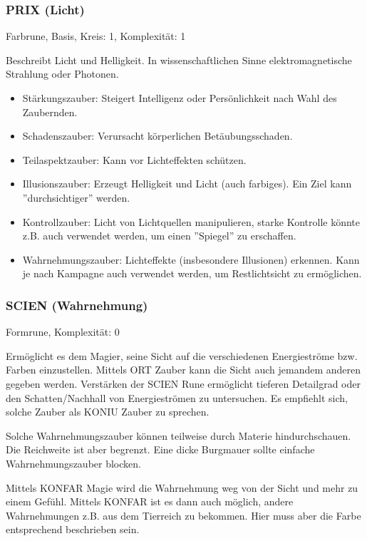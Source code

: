 \documentclass{article}
\begin{document}
\subsubsection{PRIX (Licht)}

Farbrune, Basis, Kreis: 1, Komplexität: 1

Beschreibt Licht und Helligkeit. In wissenschaftlichen Sinne elektromagnetische Strahlung oder Photonen.

\begin{itemize}
\item Stärkungszauber: Steigert Intelligenz oder Persönlichkeit nach Wahl des Zaubernden.
\item Schadenszauber: Verursacht körperlichen Betäubungsschaden.
\item Teilaspektzauber: Kann vor Lichteffekten schützen.
\item Illusionszauber: Erzeugt Helligkeit und Licht (auch farbiges). Ein Ziel kann ''durchsichtiger'' werden.
\item Kontrollzauber: Licht von Lichtquellen manipulieren, starke Kontrolle könnte z.B. auch verwendet werden, um einen ''Spiegel'' zu erschaffen.
\item Wahrnehmungszauber: Lichteffekte (insbesondere Illusionen) erkennen. Kann je nach Kampagne auch verwendet werden, um Restlichtsicht zu ermöglichen.
\end{itemize}

\subsubsection{SCIEN (Wahrnehmung)}

Formrune, Komplexität: 0

Ermöglicht es dem Magier, seine Sicht auf die verschiedenen Energieströme bzw. Farben einzustellen. Mittels ORT Zauber
kann die Sicht auch jemandem anderen gegeben werden. Verstärken der SCIEN Rune ermöglicht tieferen Detailgrad oder den
Schatten/Nachhall von Energieströmen zu untersuchen. Es empfiehlt sich, solche Zauber als KONIU Zauber zu sprechen.

Solche Wahrnehmungszauber können teilweise durch Materie hindurchschauen. Die Reichweite ist aber begrenzt. Eine dicke
Burgmauer sollte einfache Wahrnehmungszauber blocken.

Mittels KONFAR Magie wird die Wahrnehmung weg von der Sicht und mehr zu einem Gefühl. Mittels KONFAR ist es dann auch
möglich, andere Wahrnehmungen z.B. aus dem Tierreich zu bekommen. Hier muss aber die Farbe entsprechend beschrieben sein.
\end{document}

